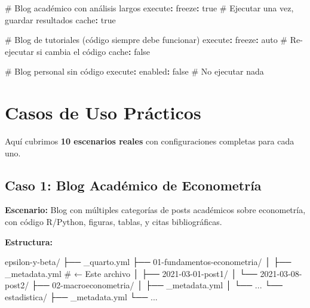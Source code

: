 \documentclass[
  doc,
  floatsintext,
  longtable,
  a4paper,
  nolmodern,
  notxfonts,
  notimes,
  12pt,
  colorlinks=true,linkcolor=blue,citecolor=blue,urlcolor=blue]{apa7}
\newenvironment{Shaded}{\begin{snugshade}}{\end{snugshade}}
\newcommand{\AttributeTok}[1]{\textcolor[rgb]{0.40,0.45,0.13}{#1}}
\newcommand{\CharTok}[1]{\textcolor[rgb]{0.13,0.47,0.30}{#1}}
\newcommand{\CommentTok}[1]{\textcolor[rgb]{0.37,0.37,0.37}{#1}}
\newcommand{\ExtensionTok}[1]{\textcolor[rgb]{0.00,0.23,0.31}{#1}}
\newcommand{\FunctionTok}[1]{\textcolor[rgb]{0.28,0.35,0.67}{#1}}
\newcommand{\KeywordTok}[1]{\textcolor[rgb]{0.00,0.23,0.31}{\textbf{#1}}}
\newcommand{\NormalTok}[1]{\textcolor[rgb]{0.00,0.23,0.31}{#1}}
\begin{document}
\begin{Shaded}
\begin{Highlighting}[]
\CommentTok{\# Blog académico con análisis largos}
\FunctionTok{execute}\KeywordTok{:}
\AttributeTok{  }\FunctionTok{freeze}\KeywordTok{:}\AttributeTok{ }\CharTok{true}\CommentTok{          \# Ejecutar una vez, guardar resultados}
\AttributeTok{  }\FunctionTok{cache}\KeywordTok{:}\AttributeTok{ }\CharTok{true}

\CommentTok{\# Blog de tutoriales (código siempre debe funcionar)}
\FunctionTok{execute}\KeywordTok{:}
\AttributeTok{  }\FunctionTok{freeze}\KeywordTok{:}\AttributeTok{ auto}\CommentTok{          \# Re{-}ejecutar si cambia el código}
\AttributeTok{  }\FunctionTok{cache}\KeywordTok{:}\AttributeTok{ }\CharTok{false}

\CommentTok{\# Blog personal sin código}
\FunctionTok{execute}\KeywordTok{:}
\AttributeTok{  }\FunctionTok{enabled}\KeywordTok{:}\AttributeTok{ }\CharTok{false}\CommentTok{        \# No ejecutar nada}
\end{Highlighting}
\end{Shaded}

\section{Casos de Uso Prácticos}\label{casos-de-uso-pruxe1cticos}

Aquí cubrimos \textbf{10 escenarios reales} con configuraciones
completas para cada uno.

\subsection{Caso 1: Blog Académico de
Econometría}\label{caso-1-blog-acaduxe9mico-de-econometruxeda}

\textbf{Escenario:} Blog con múltiples categorías de posts académicos
sobre econometría, con código R/Python, figuras, tablas, y citas
bibliográficas.

\textbf{Estructura:}

\begin{Shaded}
\begin{Highlighting}[]
\ExtensionTok{epsilon{-}y{-}beta/}
\ExtensionTok{├──}\NormalTok{ \_quarto.yml}
\ExtensionTok{├──}\NormalTok{ 01{-}fundamentos{-}econometria/}
\ExtensionTok{│}\NormalTok{   ├── \_metadata.yml          }\CommentTok{\# ← Este archivo}
\ExtensionTok{│}\NormalTok{   ├── 2021{-}03{-}01{-}post1/}
\ExtensionTok{│}\NormalTok{   └── 2021{-}03{-}08{-}post2/}
\ExtensionTok{├──}\NormalTok{ 02{-}macroeconometria/}
\ExtensionTok{│}\NormalTok{   ├── \_metadata.yml}
\ExtensionTok{│}\NormalTok{   └── ...}
\ExtensionTok{└──}\NormalTok{ estadistica/}
    \ExtensionTok{├──}\NormalTok{ \_metadata.yml}
    \ExtensionTok{└──}\NormalTok{ ...}
\end{Highlighting}
\end{Shaded}
\end{document}
